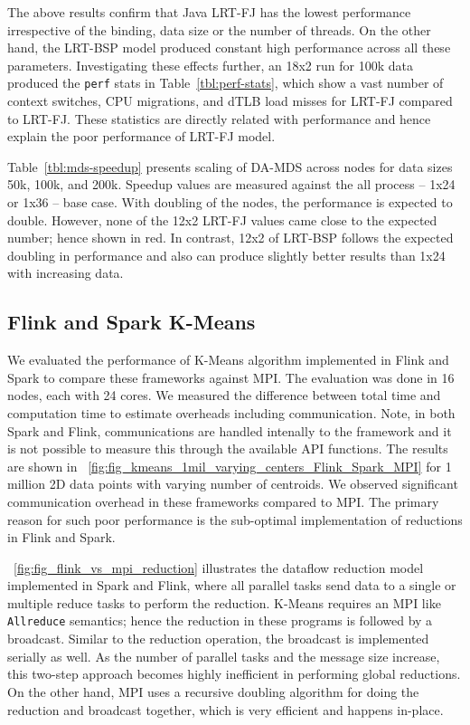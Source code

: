 \documentclass[10pt, conference, compsocconf]{IEEEtran}
\begin{document}
The above results confirm that Java \ac{LRT-FJ} has the lowest performance irrespective of the binding, data size or the number of threads. On the other hand, the \ac{LRT-BSP} model produced constant high performance across all these parameters. Investigating these effects further, an 18x2 run for 100k data produced the \texttt{perf} stats in Table~\ref{tbl:perf-stats}, which show a vast number of context switches, \acs{CPU} migrations, and \acl{dTLB} load misses for \ac{LRT-FJ} compared to \ac{LRT-FJ}. These statistics are directly related with performance and hence explain the poor performance of \ac{LRT-FJ} model.

Table~\ref{tbl:mds-speedup} presents scaling of \ac{DA-MDS} across nodes for data sizes 50k, 100k, and 200k. Speedup values are measured against the all process -- 1x24 or 1x36 -- base case. With doubling of the nodes, the performance is expected to double. However, none of the 12x2 \ac{LRT-FJ} values came close to the expected number; hence shown in red.  In contrast, 12x2 of \ac{LRT-BSP} follows the expected doubling in performance and also can produce slightly better results than 1x24 with increasing data.

\subsection{Flink and Spark K-Means}
We evaluated the performance of K-Means algorithm implemented in Flink and Spark to compare these frameworks against \ac{MPI}. The evaluation was done in 16 nodes, each with 24 cores. We measured the difference between total time and computation time to estimate overheads including communication. Note, in both Spark and Flink, communications are handled intenally to the framework and it is not possible to measure this through the available \ac{API} functions. The results are shown in \figurename~\ref{fig:fig_kmeans_1mil_varying_centers_Flink_Spark_MPI} for 1 million 2D data points with varying number of centroids. We observed significant communication overhead in these frameworks compared to \ac{MPI}. The primary reason for such poor performance is the sub-optimal implementation of reductions in Flink and Spark.

\figurename~\ref{fig:fig_flink_vs_mpi_reduction} illustrates the dataflow reduction model implemented in Spark and Flink, where all parallel tasks send data to a single or multiple reduce tasks to perform the reduction. K-Means requires an \ac{MPI} like \texttt{Allreduce} semantics; hence the reduction in these programs is followed by a broadcast. Similar to the reduction operation, the broadcast is implemented serially as well. As the number of parallel tasks and the message size increase, this two-step approach becomes highly inefficient in performing global reductions. On the other hand, \ac{MPI} uses a recursive doubling algorithm for doing the reduction and broadcast together, which is very efficient and happens in-place. 
\end{document}
